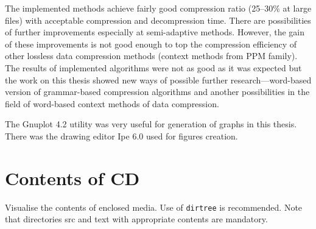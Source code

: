 \documentclass[thesis=M,english]{FITthesis}[2019/12/23]
\begin{document}
\begin{conclusion}
	The implemented methods achieve fairly good compression ratio (25--30$\%$ at large files) with acceptable compression and decompression time. There are possibilities of further improvements especially at semi-adaptive methods. However, the gain of these improvements is not good enough to top the compression efficiency of other lossless data compression methods (context methods from PPM family). The results of implemented algorithms were not as good as it was expected but the work on this thesis showed new ways of possible further research---word-based version of grammar-based compression algorithms and another possibilities in the field of word-based context methods of data compression.

	The Gnuplot 4.2 utility was very useful for generation of graphs in this thesis. There was the drawing editor Ipe 6.0 used for figures creation.
	\nocite{Po01}
\end{conclusion}




\appendix


\chapter{Contents of CD}\label{app:CDcontent}

Visualise the contents of enclosed media. Use of \verb|dirtree| is recommended. Note that directories src and text with appropriate contents are mandatory.


\begin{figure}
\end{figure}
\end{document}
